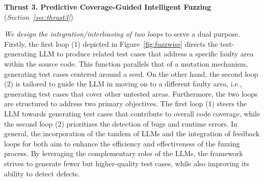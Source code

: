 

\vspace{3pt}
\noindent \textbf{Thrust 3. Predictive Coverage-Guided Intelligent Fuzzing}  ({\em Section~\ref{sec:thrust3}})

{\em We design the integration/interleaving of two loops} to serve a
dual purpose. Firstly, the first loop (1) depicted in
Figure~\ref{fig:fuzzwise} directs the test-generating LLM to produce
related test cases that address a specific faulty area within the
source code. This function parallels that of a mutation mechanism,
generating test cases centered around a seed. On the other hand, the
second loop (2) is tailored to guide the LLM in moving on to a
different faulty area, i.e., generating test cases that cover other
untested areas. Furthermore, the two loops are structured to address
two primary objectives. The first loop (1) steers the LLM towards
generating test cases that contribute to overall code coverage, while
the second loop (2) prioritizes the detection of bugs and runtime
errors. In general, the incorporation of the tandem of LLMs and the
integration of feedback loops for both aim to enhance the efficiency
and effectiveness of the fuzzing process. By leveraging the
complementary roles of the LLMs, the framework strives to generate
fewer but higher-quality test cases, while also improving its ability
to detect defects.



